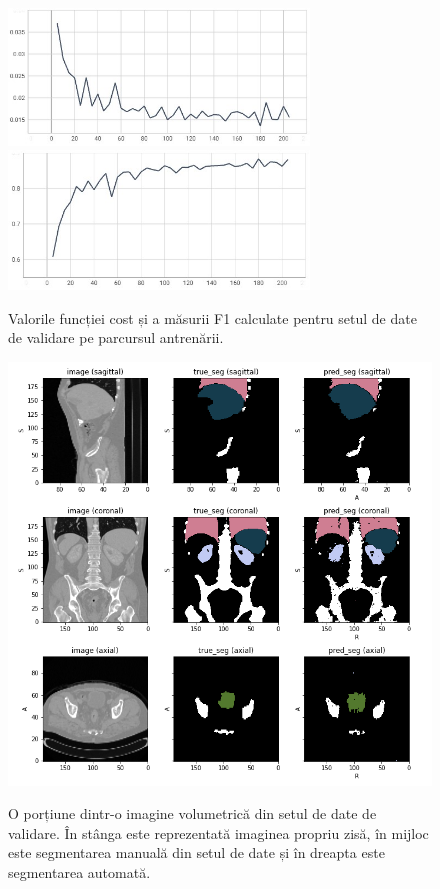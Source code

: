 \begin{figure}[!htb]
    \centering
    \includegraphics[width=8cm]{images/seg_train_results/validation_loss.jpg}
    \includegraphics[width=8cm]{images/seg_train_results/validation_f1.jpg}
    \\
    \caption{Valorile funcției cost și a măsurii F1 calculate pentru setul de date de validare pe parcursul antrenării.}
    \label{fig:res_validation}
\end{figure}

\begin{figure}[!htb]
    \centering
    \includegraphics[width=15cm]{images/seg_train_results/041.png}
    \\
    \caption{O porțiune dintr-o imagine volumetrică din setul de date de validare. În stânga este reprezentată imaginea propriu zisă, în mijloc este segmentarea manuală din setul de date și în dreapta este segmentarea automată.}
    \label{fig:results_pytorch}
\end{figure}

